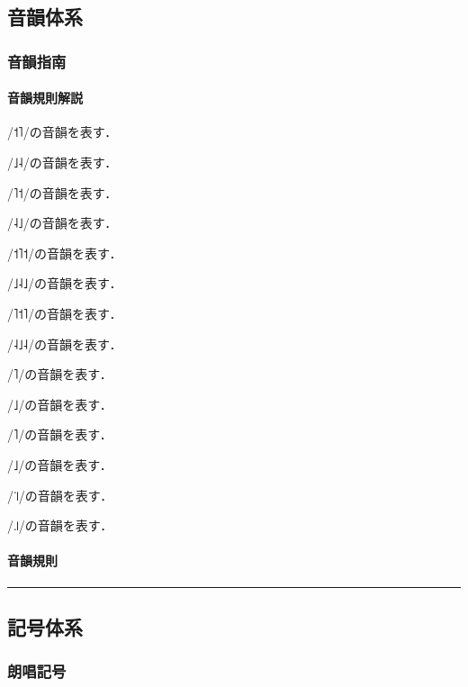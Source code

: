 \documentclass[
  japanese,
]{article}
\providecommand{\tightlist}{%
  \setlength{\itemsep}{0pt}\setlength{\parskip}{0pt}}
\begin{document}
\subsection{音韻体系}\label{chapter2}

\subsubsection{音韻指南}\label{section2.1}

\paragraph{音韻規則解説}\label{subsection2.1.1}

\begin{description}
\tightlist
\item[{◌́}]
/{˦˥}/の音韻を表す．
\item[{◌̗}]
/{˩˨}/の音韻を表す．
\item[{◌̀}]
/{˥˦}/の音韻を表す．
\item[{◌̖}]
/{˨˩}/の音韻を表す．
\item[{◌̂}]
/{˦˥˦}/の音韻を表す．
\item[{◌̭}]
/{˩˨˩}/の音韻を表す．
\item[{◌̌}]
/{˥˦˥}/の音韻を表す．
\item[{◌̬}]
/{˨˩˨}/の音韻を表す．
\item[{◌̄}]
/{˥}/の音韻を表す．
\item[{◌̱}]
/{˩}/の音韻を表す．
\item[{◌̈}]
/{˥}/の音韻を表す．
\item[{◌̤}]
/{˩}/の音韻を表す．
\item[{◌̇}]
/{꜈}/の音韻を表す．
\item[{◌̣}]
/{꜌}/の音韻を表す．
\end{description}

\paragraph{音韻規則}\label{subsection2.1.2}

\begin{center}\rule{0.5\linewidth}{0.5pt}\end{center}

\subsection{記号体系}\label{chapter3}

\subsubsection{朗唱記号}\label{section3.1}
\end{document}
